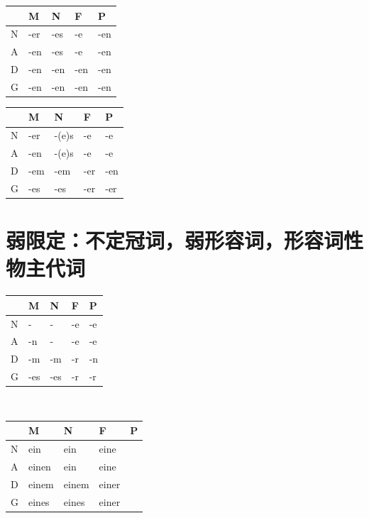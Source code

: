 \begin{tabular}{|M{2em}|M{2em}|M{2em}|M{2em}|M{2em}|}
    \hline
      & M   & N   & F   & P   \\
    \hline
    N & -er & -es & -e  & -en \\
    \hline
    A & -en & -es & -e  & -en \\
    \hline
    D & -en & -en & -en & -en \\
    \hline
    G & -en & -en & -en & -en \\
    \hline
\end{tabular}
\begin{tabular}{|M{2em}|M{2em}|M{2em}|M{2em}|M{2em}|}
    \hline
      & M   & N     & F   & P   \\
    \hline
    N & -er & -(e)s & -e  & -e  \\
    \hline
    A & -en & -(e)s & -e  & -e  \\
    \hline
    D & -em & -em   & -er & -en \\
    \hline
    G & -es & -es   & -er & -er \\
    \hline
\end{tabular}
\section{弱限定：不定冠词，弱形容词，形容词性物主代词}
\begin{tabular}{|M{2em}|M{2em}|M{2em}|M{2em}|M{2em}|}
    \hline
      & M   & N   & F  & P  \\
    \hline
    N & -   & -   & -e & -e \\
    \hline
    A & -n  & -   & -e & -e \\
    \hline
    D & -m  & -m  & -r & -n \\
    \hline
    G & -es & -es & -r & -r \\
    \hline
\end{tabular} \\

\begin{tabular}{|M{2em}|M{2em}|M{2em}|M{2em}|M{2em}|}
    \hline
      & M     & N     & F     & P \\
    \hline
    N & ein   & ein   & eine  &   \\
    \hline
    A & einen & ein   & eine  &   \\
    \hline
    D & einem & einem & einer &   \\
    \hline
    G & eines & eines & einer &   \\
    \hline
\end{tabular} \\

